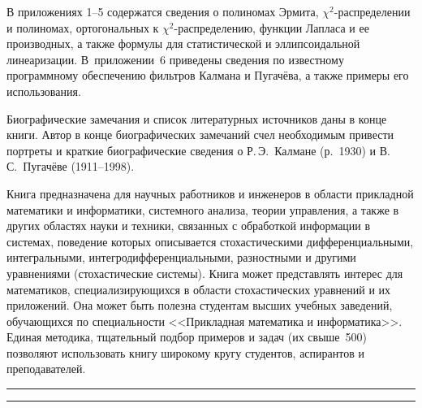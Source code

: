 \begin{multicols}{2}
{     В приложениях 1--5 содержатся сведения о полиномах Эрмита,
     $\chi^2$-распределении и полиномах, ортогональных к
     $\chi^2$-распределению, функции Лап\-ла\-са и ее производных, а также формулы
для статистической и эллипсоидальной линеаризации. В~приложении~6 приведены
сведения по известному программному обеспечению фильтров Калмана и Пугачёва, а
также примеры его использования.

Биографические замечания и список
литературных источников даны в конце книги. Автор в конце биографических
замечаний счел необходимым привести портреты и краткие биографические сведения
о Р.\,Э.~Калмане (р.~1930) и В.\,С.~Пугачёве (1911--1998).

     Книга предназначена для научных работников и инженеров в области
прикладной математики и информатики, системного анализа, теории управ\-ле\-ния, а
также в  других областях науки и техники, связанных с обработкой информации в
системах, поведение которых описывается стохастическими дифференциальными,
интегральными, интегродифференциальными, разностными и другими уравнениями
(стохастические системы). Книга может представлять интерес для математиков,
спе\-циа\-ли\-зи\-ру\-ющих\-ся в области стохастических уравнений и их приложений. Она
может быть полезна студентам высших учебных заведений, обуча\-ющих\-ся по
специальности <<Прикладная математика и информатика>>.
Единая методика,
тщательный подбор примеров и задач (их свыше~500) позволяют использовать книгу
широкому кругу студентов, аспирантов и преподавателей.


}

\end{multicols}

\vspace*{9pt}

\hrule

\vspace*{3pt}

\hrule




\def\tit{МОНОГРАФИЯ В.\,Е.~БЕНИНГА, В.\,Ю.~КОРОЛЕВА, И.\,А.~СОКОЛОВА, С.\,Я.~ШОРГИНА
<<РАНДОМИЗИРОВАННЫЕ МОДЕЛИ И МЕТОДЫ ТЕОРИИ НАДЕЖНОСТИ ИНФОРМАЦИОННЫХ И
ТЕХНИЧЕСКИХ СИСТЕМ>> (М.: ТОРУС ПРЕСС, 2007. 256~с.)}

\def\aut{Д.ф.-м.н., профессор  А.\,В.~Печинкин}

